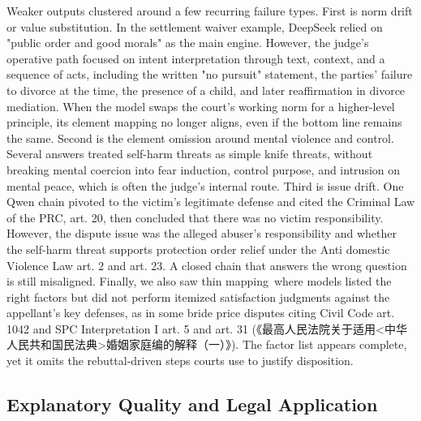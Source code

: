 {{{{{{{{{{{{{{Weaker outputs clustered around a few recurring failure types. First is norm drift or value substitution. In the settlement waiver example, DeepSeek relied on "public order and good morals" as the main engine. However, the judge's operative path focused on intent interpretation through text, context, and a sequence of acts, including the written "no pursuit" statement, the parties' failure to divorce at the time, the presence of a child, and later reaffirmation in divorce mediation. When the model swaps the court's working norm for a higher-level principle, its element mapping no longer aligns, even if the bottom line remains the same. Second is the element omission around mental violence and control. Several answers treated self-harm threats as simple knife threats, without breaking mental coercion into fear induction, control purpose, and intrusion on mental peace, which is often the judge's internal route. Third is issue drift. One Qwen chain pivoted to the victim's legitimate defense and cited the Criminal Law of the PRC, art. 20, then concluded that there was no victim responsibility. However, the dispute issue was the alleged abuser's responsibility and whether the self-harm threat supports protection order relief under the Anti domestic Violence Law art. 2 and art. 23. A closed chain that answers the wrong question is still misaligned. Finally, we also saw thin mapping~where models listed the right factors but did not perform itemized satisfaction judgments against the appellant's key defenses, as in some bride price disputes citing Civil Code art. 1042 and SPC Interpretation I art. 5 and art. 31 (《最高人民法院关于适用\textless 中华人民共和国民法典\textgreater 婚姻家庭编的解释（一）》). The factor list appears complete, yet it omits the rebuttal-driven steps courts use to justify disposition.

\hypertarget{explanatory-quality-and-legal-application}{%
\subsection{Explanatory Quality and Legal Application}\label{explanatory-quality-and-legal-application}

}}}}}}}}}}}}}}}
